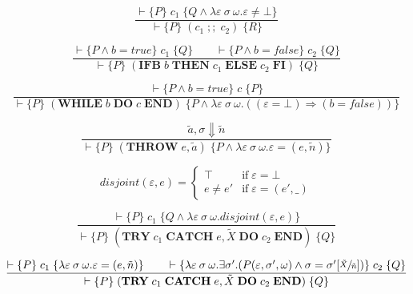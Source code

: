 \begin{equation}\label{eqn:hoare-seq-exn}
\frac{\vdash \{P\} \; c_1 \; \{Q \wedge \lambda \varepsilon\:\sigma\:\omega. \varepsilon \neq \bot\}}{\vdash \{P\} \; (c_1\; ;;\; c_2) \; \{R\}}
\end{equation}

\begin{equation}
\frac{\vdash \{P \wedge b=true\} \; c_1 \; \{Q\} \qquad \vdash \{P \wedge b=false\} \; c_2 \; \{Q\}}{\vdash \{P\} \; (\textbf{IFB}\; b\; \textbf{THEN}\; c_1\; \textbf{ELSE}\; c_2\; \textbf{FI}) \; \{Q\}}
\end{equation}

\begin{equation}
\frac{\vdash \{P \wedge b = true\} \; c \; \{P\}}{\vdash \{P\} \; (\textbf{WHILE}\; b\; \textbf{DO}\; c\; \textbf{END}) \; \{P \wedge \lambda \varepsilon\:\sigma\:\omega.((\varepsilon = \bot) \Rightarrow (b = false))\}}
\end{equation}

\begin{equation}\label{eqn:hoare-throw}
\frac{\tilde{a}, \sigma \Downarrow \tilde{n}}{\vdash \{P\} \; (\textbf{THROW}\; e, \tilde{a}) \; \{P \wedge \lambda \varepsilon\:\sigma\:\omega. \varepsilon = (e, \tilde{n})\}}
\end{equation}

\begin{equation}
disjoint(\varepsilon, e) = \begin{cases}
\top & \mbox{if} \; \varepsilon = \bot \\
e \neq e' & \mbox{if} \; \varepsilon = (e', \_)
\end{cases}
\end{equation}

\begin{equation}\label{eqn:hoare-try}
\frac{\vdash \{P\} \; c_1 \; \{Q \wedge \lambda \varepsilon\:\sigma\:\omega. disjoint(\varepsilon, e)\}}{\vdash \{P\} \; (\textbf{TRY}\; c_1\; \textbf{CATCH}\; e, \tilde{X}\; \textbf{DO}\; c_2\; \textbf{END}) \; \{Q\}}
\end{equation}

\begin{equation}\label{eqn:hoare-catch}
\frac{\vdash \{P\} \; c_1 \; \{\lambda \varepsilon\:\sigma\:\omega. \varepsilon = (e, \tilde{n})\} \qquad \vdash \{\lambda \varepsilon\:\sigma\:\omega. \exists \sigma'. (P(\varepsilon, \sigma', \omega) \wedge \sigma = \sigma'[\sfrac{\tilde{X}}{\tilde{n}}])\} \; c_2 \; \{Q\}}{\vdash \{P\} \; (\textbf{TRY}\; c_1\; \textbf{CATCH}\; e, \tilde{X}\; \textbf{DO}\; c_2\; \textbf{END}) \; \{Q\}}
\end{equation}


